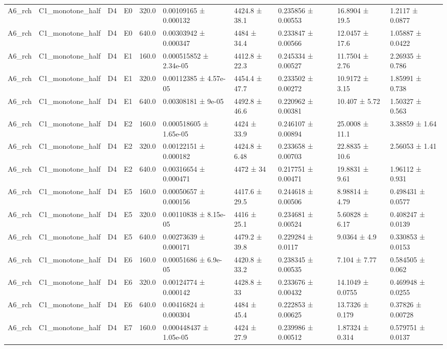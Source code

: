 \begin{table}
\begin{tabular}{llllllllll}
A6\_rch & C1\_monotone\_half & D4 & E0 & 320.0 & 0.00109165 ± 0.000132 & 4424.8 ± 38.1 & 0.235856 ± 0.00553 & 16.8904 ± 19.5 & 1.2117 ± 0.0877 \\
A6\_rch & C1\_monotone\_half & D4 & E0 & 640.0 & 0.00303942 ± 0.000347 & 4484 ± 34.4 & 0.233847 ± 0.00566 & 12.0457 ± 17.6 & 1.05887 ± 0.0422 \\
A6\_rch & C1\_monotone\_half & D4 & E1 & 160.0 & 0.000515852 ± 2.34e-05 & 4412.8 ± 22.3 & 0.245334 ± 0.00527 & 11.7504 ± 2.76 & 2.26935 ± 0.786 \\
A6\_rch & C1\_monotone\_half & D4 & E1 & 320.0 & 0.00112385 ± 4.57e-05 & 4454.4 ± 47.7 & 0.233502 ± 0.00272 & 10.9172 ± 3.15 & 1.85991 ± 0.738 \\
A6\_rch & C1\_monotone\_half & D4 & E1 & 640.0 & 0.00308181 ± 9e-05 & 4492.8 ± 46.6 & 0.220962 ± 0.00381 & 10.407 ± 5.72 & 1.50327 ± 0.563 \\
A6\_rch & C1\_monotone\_half & D4 & E2 & 160.0 & 0.000518605 ± 1.65e-05 & 4424 ± 33.9 & 0.246107 ± 0.00894 & 25.0008 ± 11.1 & 3.38859 ± 1.64 \\
A6\_rch & C1\_monotone\_half & D4 & E2 & 320.0 & 0.00122151 ± 0.000182 & 4424.8 ± 6.48 & 0.233658 ± 0.00703 & 22.8835 ± 10.6 & 2.56053 ± 1.41 \\
A6\_rch & C1\_monotone\_half & D4 & E2 & 640.0 & 0.00316654 ± 0.000471 & 4472 ± 34 & 0.217751 ± 0.00471 & 19.8831 ± 9.61 & 1.96112 ± 0.931 \\
A6\_rch & C1\_monotone\_half & D4 & E5 & 160.0 & 0.00050657 ± 0.000156 & 4417.6 ± 29.5 & 0.244618 ± 0.00506 & 8.98814 ± 4.79 & 0.498431 ± 0.0577 \\
A6\_rch & C1\_monotone\_half & D4 & E5 & 320.0 & 0.00110838 ± 8.15e-05 & 4416 ± 25.1 & 0.234681 ± 0.00524 & 5.60828 ± 6.17 & 0.408247 ± 0.0139 \\
A6\_rch & C1\_monotone\_half & D4 & E5 & 640.0 & 0.00273639 ± 0.000171 & 4479.2 ± 39.8 & 0.229284 ± 0.0117 & 9.0364 ± 4.9 & 0.330853 ± 0.0153 \\
A6\_rch & C1\_monotone\_half & D4 & E6 & 160.0 & 0.00051686 ± 6.9e-05 & 4420.8 ± 33.2 & 0.238345 ± 0.00535 & 7.104 ± 7.77 & 0.584505 ± 0.062 \\
A6\_rch & C1\_monotone\_half & D4 & E6 & 320.0 & 0.00124774 ± 0.000142 & 4428.8 ± 33 & 0.233676 ± 0.00432 & 14.1049 ± 0.0755 & 0.469948 ± 0.0255 \\
A6\_rch & C1\_monotone\_half & D4 & E6 & 640.0 & 0.00416824 ± 0.000304 & 4484 ± 45.4 & 0.222853 ± 0.00625 & 13.7326 ± 0.179 & 0.37826 ± 0.00728 \\
A6\_rch & C1\_monotone\_half & D4 & E7 & 160.0 & 0.000448437 ± 1.05e-05 & 4424 ± 27.9 & 0.239986 ± 0.00512 & 1.87324 ± 0.314 & 0.579751 ± 0.0137 \\

\end{tabular}
\end{table}
